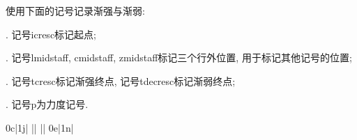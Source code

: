 使用下面的记号记录渐强与渐弱:\par
{}. 记号icresc标记起点;\par
{}. 记号lmidstaff, cmidstaff, zmidstaff标记三个行外位置, 用于标记其他记号的位置;\par
{}. 记号tcresc标记渐强终点, 记号tdecresc标记渐弱终点;\par
{}. 记号p为力度记号.\par
\startextract
    \Notes \zmidstaff{\p}\islurd0c\icresc|\isluru1j\en\bar
    \Notes {}|\en\bar
    \Notes {}\cmidstaff{\tcresc}|\en\bar
    \NOTEs \tslur0e|\tslur1n\en\bar
\zendextract


